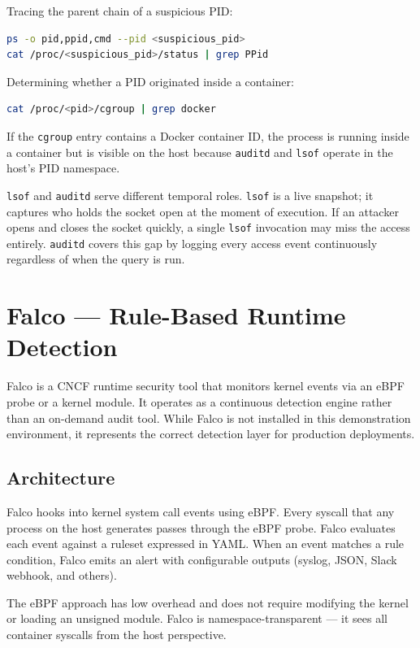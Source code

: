 Tracing the parent chain of a suspicious PID:

\begin{lstlisting}[language=bash]
ps -o pid,ppid,cmd --pid <suspicious_pid>
cat /proc/<suspicious_pid>/status | grep PPid
\end{lstlisting}

Determining whether a PID originated inside a container:

\begin{lstlisting}[language=bash]
cat /proc/<pid>/cgroup | grep docker
\end{lstlisting}

If the \texttt{cgroup} entry contains a Docker container ID, the process is running inside a container but is visible on the host because \texttt{auditd} and \texttt{lsof} operate in the host's PID namespace.

\texttt{lsof} and \texttt{auditd} serve different temporal roles. \texttt{lsof} is a live snapshot; it captures who holds the socket open at the moment of execution. If an attacker opens and closes the socket quickly, a single \texttt{lsof} invocation may miss the access entirely. \texttt{auditd} covers this gap by logging every access event continuously regardless of when the query is run.


\section{Falco --- Rule-Based Runtime Detection}

Falco is a CNCF runtime security tool that monitors kernel events via an eBPF probe or a kernel module. It operates as a continuous detection engine rather than an on-demand audit tool. While Falco is not installed in this demonstration environment, it represents the correct detection layer for production deployments.

\subsection{Architecture}

Falco hooks into kernel system call events using eBPF. Every syscall that any process on the host generates passes through the eBPF probe. Falco evaluates each event against a ruleset expressed in YAML. When an event matches a rule condition, Falco emits an alert with configurable outputs (syslog, JSON, Slack webhook, and others).

The eBPF approach has low overhead and does not require modifying the kernel or loading an unsigned module. Falco is namespace-transparent --- it sees all container syscalls from the host perspective.

